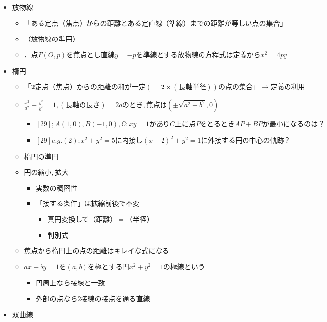 \documentclass[dvipdfmx,uplatex]{jsarticle}
\begin{document}
\begin{itemize}
\begin{itemize}
	\end{itemize}
	\item $ 放物線$
	\begin{itemize}
		\item $ \bm{「ある定点（焦点）からの距離とある定直線（準線）までの距離が等しい点の集合」}$
		\item $ （放物線の準円）$
		\item $．点F(O,p)を焦点とし直線y=-pを準
		線とする放物線の方程式は定義からx^2=4py
		$
	\end{itemize}
	\item $ 楕円$
	\begin{itemize}
		\item $ \bm{「2定点（焦点）からの距離の和が一定(=2 \times (長軸半径) )の点の集合」} \rightarrow 定義の利用 $
		\item $ \frac{x^2}{a^2}+ \frac{y^2}{b^2}=1,(長軸の長さ)=2aのとき,焦点は( \pm \sqrt{a^2-b^2},0)$
		\begin{itemize}
			\item $ [29];A(1,0),B(-1,0),C:xy=1がありC上に点PをとるときAP+BPが最小になるのは？$
			\item $ [29]e.g.(2);x^2+y^2=5に内接し(x-2)^2+y^2=1に外接する円の中心の軌跡？$
		\end{itemize}
		\item $ 楕円の準円$
		\item $ 円の縮小,拡大$
		\begin{itemize}
			\item $ 実数の稠密性$
			\item $ 「接する条件」は拡縮前後で不変$
			\begin{itemize}
				\item $ 真円変換して（距離） = （半径）$
				\item $ 判別式$
			\end{itemize}
		\end{itemize}
		\item $ 焦点から楕円上の点の距離はキレイな式になる$
		\item $ ax + by = 1を(a,b)を極とする円x^2+y^2=1の極線という$
		\begin{itemize}
			\item $ 円周上なら接線と一致$
			\item $ 外部の点なら2接線の接点を通る直線$
		\end{itemize}
	\end{itemize}
	\item $ 双曲線$
	\begin{itemize}

\end{itemize}
\end{itemize}
\end{document}
